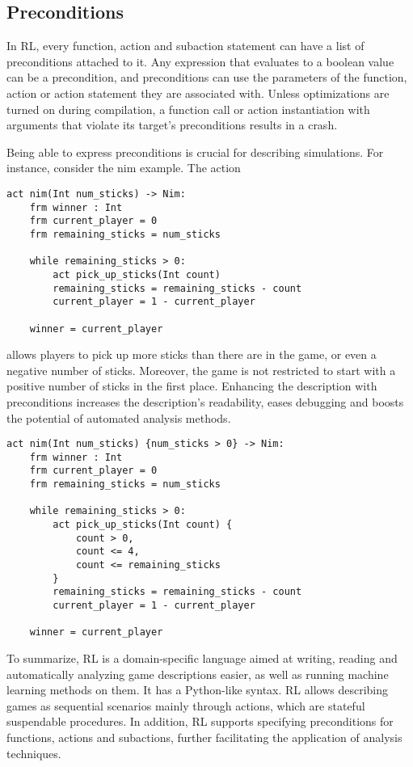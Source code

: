 \subsection{Preconditions}
In RL, every function, action and subaction statement can have a list of preconditions attached to it.
Any expression that evaluates to a boolean value can be a precondition, and preconditions can use the parameters of the function, action or action statement they are associated with.
Unless optimizations are turned on during compilation, a function call or action instantiation with arguments that violate its target's preconditions results in a crash.

Being able to express preconditions is crucial for describing simulations.
For instance, consider the nim example. The action 
\begin{lstlisting}
act nim(Int num_sticks) -> Nim:
    frm winner : Int
    frm current_player = 0
    frm remaining_sticks = num_sticks

    while remaining_sticks > 0:
        act pick_up_sticks(Int count)
        remaining_sticks = remaining_sticks - count
        current_player = 1 - current_player

    winner = current_player
\end{lstlisting}
allows players to pick up more sticks than there are in the game, or even a negative number of sticks.
Moreover, the game is not restricted to start with a positive number of sticks in the first place.
Enhancing the description with preconditions increases the description's readability, eases debugging and boosts the potential of automated analysis methods.
\begin{lstlisting}
act nim(Int num_sticks) {num_sticks > 0} -> Nim:
    frm winner : Int
    frm current_player = 0
    frm remaining_sticks = num_sticks

    while remaining_sticks > 0:
        act pick_up_sticks(Int count) {
            count > 0,
            count <= 4,
            count <= remaining_sticks
        }
        remaining_sticks = remaining_sticks - count
        current_player = 1 - current_player

    winner = current_player
\end{lstlisting}
To summarize, RL is a domain-specific language aimed at writing, reading and automatically analyzing game descriptions easier, as well as running machine learning methods on them.
It has a Python-like syntax. RL allows describing games as sequential scenarios mainly through actions, which are stateful suspendable procedures.
In addition, RL supports specifying preconditions for functions, actions and subactions, further facilitating the application of analysis techniques.